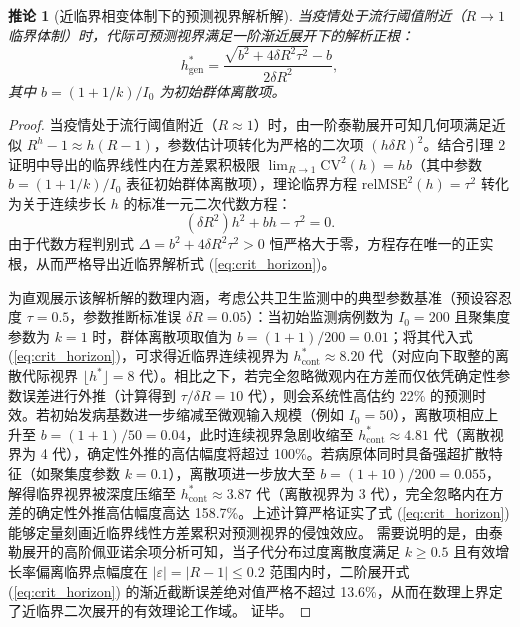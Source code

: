 \documentclass[11pt,a4paper]{article}
\theoremstyle{plain}
\newtheorem{corollary}{推论}
\theoremstyle{definition}
\begin{document}
\begin{corollary}[近临界相变体制下的预测视界解析解]\label{cor:near_crit_horizon}
当疫情处于流行阈值附近（$R \to 1$ 临界体制）时，代际可预测视界满足一阶渐近展开下的解析正根：
\begin{equation}
h^*_{\text{gen}} = \frac{\sqrt{b^2 + 4 \delta R^2 \tau^2} - b}{2 \delta R^2},
\label{eq:crit_horizon}
\end{equation}
其中 $b = (1+1/k)/I_0$ 为初始群体离散项。
\end{corollary}

\begin{proof}
当疫情处于流行阈值附近（$R \approx 1$）时，由一阶泰勒展开可知几何项满足近似 $R^h - 1 \approx h(R-1)$，参数估计项转化为严格的二次项 $(h\delta R)^2$。结合引理 2 证明中导出的临界线性内在方差累积极限 $\lim_{R\to 1}\text{CV}^2(h) = h b$（其中参数 $b=(1+1/k)/I_0$ 表征初始群体离散项），理论临界方程 $\text{relMSE}^2(h) = \tau^2$ 转化为关于连续步长 $h$ 的标准一元二次代数方程：
\begin{equation}
(\delta R^2) h^2 + b h - \tau^2 = 0.
\end{equation}
由于代数方程判别式 $\Delta = b^2 + 4 \delta R^2 \tau^2 > 0$ 恒严格大于零，方程存在唯一的正实根，从而严格导出近临界解析式 (\ref{eq:crit_horizon})。

为直观展示该解析解的数理内涵，考虑公共卫生监测中的典型参数基准（预设容忍度 $\tau=0.5$，参数推断标准误 $\delta R=0.05$）：当初始监测病例数为 $I_0=200$ 且聚集度参数为 $k=1$ 时，群体离散项取值为 $b=(1+1)/200 = 0.01$；将其代入式 (\ref{eq:crit_horizon})，可求得近临界连续视界为 $h^*_{\text{cont}} \approx 8.20$ 代（对应向下取整的离散代际视界 $\lfloor h^* \rfloor = 8$ 代）。相比之下，若完全忽略微观内在方差而仅依凭确定性参数误差进行外推（计算得到 $\tau/\delta R = 10$ 代），则会系统性高估约 22\% 的预测时效。若初始发病基数进一步缩减至微观输入规模（例如 $I_0=50$），离散项相应上升至 $b=(1+1)/50 = 0.04$，此时连续视界急剧收缩至 $h^*_{\text{cont}} \approx 4.81$ 代（离散视界为 4 代），确定性外推的高估幅度将超过 100\%。若病原体同时具备强超扩散特征（如聚集度参数 $k=0.1$），离散项进一步放大至 $b=(1+10)/200 = 0.055$，解得临界视界被深度压缩至 $h^*_{\text{cont}} \approx 3.87$ 代（离散视界为 3 代），完全忽略内在方差的确定性外推高估幅度高达 158.7\%。上述计算严格证实了式 (\ref{eq:crit_horizon}) 能够定量刻画近临界线性方差累积对预测视界的侵蚀效应。 需要说明的是，由泰勒展开的高阶佩亚诺余项分析可知，当子代分布过度离散度满足 $k \ge 0.5$ 且有效增长率偏离临界点幅度在 $|\varepsilon| = |R - 1| \le 0.2$ 范围内时，二阶展开式 (\ref{eq:crit_horizon}) 的渐近截断误差绝对值严格不超过 13.6\%，从而在数理上界定了近临界二次展开的有效理论工作域。
证毕。
\end{proof}
\end{document}
